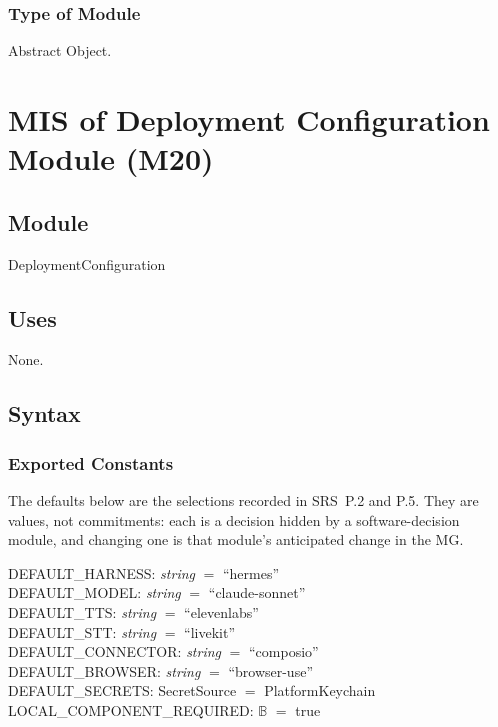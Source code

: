 \documentclass[12pt, titlepage]{article}
\newcommand{\str}{\textit{string}}
\newcommand{\B}{\mathbb{B}}
\begin{document}
\subsubsection{Type of Module}

Abstract Object.

\newpage

\section{MIS of Deployment Configuration Module (M20)} \label{mod:config}

\subsection{Module}

DeploymentConfiguration

\subsection{Uses}

None.

\subsection{Syntax}

\subsubsection{Exported Constants}

The defaults below are the selections recorded in SRS~P.2 and P.5. They are
values, not commitments: each is a decision hidden by a software-decision
module, and changing one is that module's anticipated change in the MG.

\noindent DEFAULT\_HARNESS: \str{} $=$ ``hermes''\\[2pt]
DEFAULT\_MODEL: \str{} $=$ ``claude-sonnet''\\[2pt]
DEFAULT\_TTS: \str{} $=$ ``elevenlabs''\\[2pt]
DEFAULT\_STT: \str{} $=$ ``livekit''\\[2pt]
DEFAULT\_CONNECTOR: \str{} $=$ ``composio''\\[2pt]
DEFAULT\_BROWSER: \str{} $=$ ``browser-use''\\[2pt]
DEFAULT\_SECRETS: SecretSource $=$ PlatformKeychain\\[2pt]
LOCAL\_COMPONENT\_REQUIRED: $\B$ $=$ true
\end{document}

